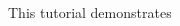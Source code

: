 

\begin{DoxyParagraph}{}
This tutorial demonstrates
\end{DoxyParagraph}

\begin{DoxyCode}{0}

\end{DoxyCode}
 